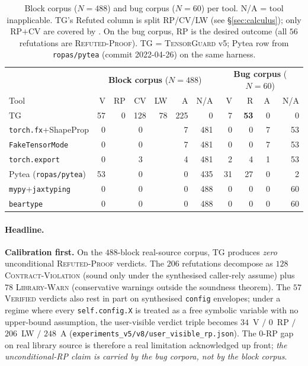 \begin{table}[t]
\centering
\caption{Block corpus ($N=488$) and bug corpus ($N=60$) per tool.
\textsc{N/A} = tool inapplicable. \textsc{TG}'s Refuted column is split
RP/CV/LW (see \S\ref{sec:calculus}); only RP$+$CV are covered by
. On the bug corpus, RP is the desired outcome
(all $56$ refutations are \textsc{Refuted-Proof}).
\textsc{TG} = \textsc{TensorGuard} v5; Pytea row from
\texttt{ropas/pytea} (commit 2022-04-26) on the same harness.}
\label{tab:headline}
\small
\setlength{\tabcolsep}{3pt}
\begin{tabular}{l rrrrrr | rrrr}
\toprule
& \multicolumn{6}{c|}{\textbf{Block corpus} ($N{=}488$)}
& \multicolumn{4}{c}{\textbf{Bug corpus} ($N{=}60$)} \\
Tool & V & RP & CV & LW & A & N/A & V & R & A & N/A \\
\midrule
\textsc{TG}                                      & 57 & 0 & 128 & 78 & 225 &   0 & 7 & \textbf{53} & 0 & 0 \\
\texttt{torch.fx}+ShapeProp                      &  0 & \multicolumn{3}{c}{0} &   7 & 481 & 0 & 0 & 7 & 53 \\
\texttt{FakeTensorMode}                          &  0 & \multicolumn{3}{c}{0} &   7 & 481 & 0 & 0 & 7 & 53 \\
\texttt{torch.export}                            &  0 & \multicolumn{3}{c}{3} &   4 & 481 & 2 & 4 & 1 & 53 \\
Pytea (\texttt{ropas/pytea})                     & 53 & \multicolumn{3}{c}{0} &   0 & 435 & 31 & 27 & 0 & 2 \\
\texttt{mypy}+\texttt{jaxtyping}                 &  0 & \multicolumn{3}{c}{0} &   0 & 488 & 0 & 0 & 0 & 60 \\
\texttt{beartype}                                &  0 & \multicolumn{3}{c}{0} &   0 & 488 & 0 & 0 & 0 & 60 \\
\bottomrule
\end{tabular}
\end{table}

\paragraph{Headline.}
\textbf{Calibration first.} On the $488$-block real-source corpus,
\textsc{TG} produces \emph{zero} unconditional \textsc{Refuted-Proof}
verdicts. The $206$ refutations decompose as $128$
\textsc{Contract-Violation} (sound only under the synthesised
caller-rely assume) plus $78$ \textsc{Library-Warn} (conservative
warnings outside the soundness theorem). The $57$ \textsc{Verified}
verdicts also rest in part on synthesised \texttt{config}
envelopes; under a regime where every \texttt{self.config.X} is
treated as a free symbolic variable with no upper-bound
assumption, the user-visible verdict triple becomes
$34$~V $/$ $0$~RP $/$ $206$~LW $/$ $248$~A
(\texttt{experiments\_v5/v8/user\_visible\_rp.json}). The
$0$-RP gap on real library source is therefore a real limitation
acknowledged up front; \emph{the unconditional-RP claim is carried
by the bug corpora, not by the block corpus}.

